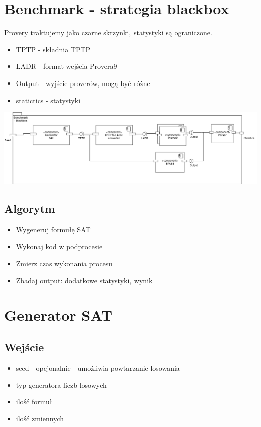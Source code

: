 \documentclass[a4paper,12pt]{article}
\begin{document}
\section{Benchmark - strategia blackbox}
Provery traktujemy jako czarne skrzynki, statystyki są ograniczone.\newline
\begin{itemize}
\item TPTP - składnia TPTP
\item LADR - format wejścia Provera9
\item Output - wyjście proverów, mogą być różne
\item statictics - statystyki
\end{itemize}
\includegraphics[scale=0.4]{studio-projektowe1.png}
\newpage

\subsection{Algorytm}
\begin{itemize}
\item Wygeneruj formułę SAT
\item Wykonaj kod w podprocesie
\item Zmierz czas wykonania procesu
\item Zbadaj output: dodatkowe statystyki, wynik
\end{itemize}


\section{Generator SAT}
\subsection{Wejście}
\begin{itemize}
\item seed - opcjonalnie - umożliwia powtarzanie losowania
\item typ generatora liczb losowych
\item ilość formuł
\item ilość zmiennych
\end{itemize}
\end{document}
